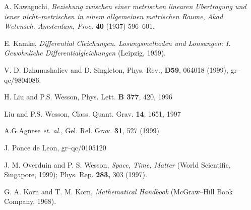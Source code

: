 \documentclass[a4paper,preprint,prabib,aps]{revtex4}
\begin{document}
\begin{references}
 A. Kawaguchi, {\it Beziehung zwischen einer
metrischen linearen Ubertragung und iener nicht--metrischen in
einem allgemeinen metrischen Raume}, {\sl Akad. Wetensch.
Amsterdam, Proc.} {\bf 40} (1937) 596--601.

  E. Kamke, {\it Differential Cleichungen. Losungsmethoden
und Lonsungen: I. Gewohnliche Differentialgleichungen} (Leipzig, 1959).

  V. D. Dzhunushaliev and D. Singleton, Phys. Rev., {\bf D59},
064018 (1999), gr--qc/9804086.

 H. Liu and P.S. Wesson, Phys. Lett. {\bf B 377}, 420, 1996

 Liu and P.S. Wesson, Class. Quant. Grav. {\bf 14}, 1651, 1997

 A.G.Agnese {\it et. al.}, Gel. Rel. Grav. {\bf 31},
527 (1999)

 J. Ponce de Leon, gr--qc/0105120

  J. M. Overduin and P. S. Wesson, {\it Space, Time, Matter}
(World Scientific, Singapore, 1999); Phys. Rep. {\bf 283,} 303 (1997).

  G. A. Korn and T. M. Korn, {\it Mathematical Handbook}
(McGraw--Hill Book Company, 1968).


\end{references}
\end{document}
